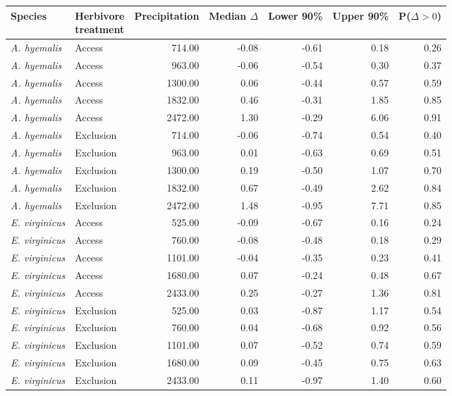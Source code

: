 \begin{tabular}{llrrrrr}
  \hline
Species & \makecell{Herbivore \\ treatment} & Precipitation & Median $\Delta$ & Lower 90\% & Upper 90\% & P($\Delta>0$) \\ 
  \hline
\textit{A. hyemalis} & Access & 714.00 & -0.08 & -0.61 & 0.18 & 0.26 \\ 
  \textit{A. hyemalis} & Access & 963.00 & -0.06 & -0.54 & 0.30 & 0.37 \\ 
  \textit{A. hyemalis} & Access & 1300.00 & 0.06 & -0.44 & 0.57 & 0.59 \\ 
  \textit{A. hyemalis} & Access & 1832.00 & 0.46 & -0.31 & 1.85 & 0.85 \\ 
  \textit{A. hyemalis} & Access & 2472.00 & 1.30 & -0.29 & 6.06 & 0.91 \\ 
  \textit{A. hyemalis} & Exclusion & 714.00 & -0.06 & -0.74 & 0.54 & 0.40 \\ 
  \textit{A. hyemalis} & Exclusion & 963.00 & 0.01 & -0.63 & 0.69 & 0.51 \\ 
  \textit{A. hyemalis} & Exclusion & 1300.00 & 0.19 & -0.50 & 1.07 & 0.70 \\ 
  \textit{A. hyemalis} & Exclusion & 1832.00 & 0.67 & -0.49 & 2.62 & 0.84 \\ 
  \textit{A. hyemalis} & Exclusion & 2472.00 & 1.48 & -0.95 & 7.71 & 0.85 \\ 
  \textit{E. virginicus} & Access & 525.00 & -0.09 & -0.67 & 0.16 & 0.24 \\ 
  \textit{E. virginicus} & Access & 760.00 & -0.08 & -0.48 & 0.18 & 0.29 \\ 
  \textit{E. virginicus} & Access & 1101.00 & -0.04 & -0.35 & 0.23 & 0.41 \\ 
  \textit{E. virginicus} & Access & 1680.00 & 0.07 & -0.24 & 0.48 & 0.67 \\ 
  \textit{E. virginicus} & Access & 2433.00 & 0.25 & -0.27 & 1.36 & 0.81 \\ 
  \textit{E. virginicus} & Exclusion & 525.00 & 0.03 & -0.87 & 1.17 & 0.54 \\ 
  \textit{E. virginicus} & Exclusion & 760.00 & 0.04 & -0.68 & 0.92 & 0.56 \\ 
  \textit{E. virginicus} & Exclusion & 1101.00 & 0.07 & -0.52 & 0.74 & 0.59 \\ 
  \textit{E. virginicus} & Exclusion & 1680.00 & 0.09 & -0.45 & 0.75 & 0.63 \\ 
  \textit{E. virginicus} & Exclusion & 2433.00 & 0.11 & -0.97 & 1.40 & 0.60 \\ 

\end{tabular}
